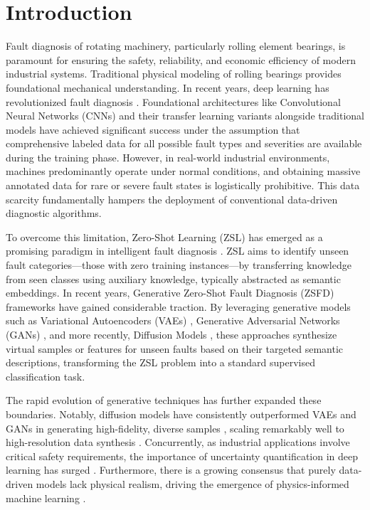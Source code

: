 \section{Introduction}
\label{sec:intro}

Fault diagnosis of rotating machinery, particularly rolling element bearings, is paramount for ensuring the safety, reliability, and economic efficiency of modern industrial systems. Traditional physical modeling of rolling bearings \cite{harris2001rolling,mcfadden1984model} provides foundational mechanical understanding. In recent years, deep learning has revolutionized fault diagnosis \cite{liu2018artificial}. Foundational architectures like Convolutional Neural Networks (CNNs) \cite{jia2016deep,wen2018new,zhang2018deep} and their transfer learning variants \cite{li2020deep} alongside traditional models \cite{zhao2019deep,lei2020applications} have achieved significant success under the assumption that comprehensive labeled data for all possible fault types and severities are available during the training phase. However, in real-world industrial environments, machines predominantly operate under normal conditions, and obtaining massive annotated data for rare or severe fault states is logistically prohibitive. This data scarcity fundamentally hampers the deployment of conventional data-driven diagnostic algorithms. 

To overcome this limitation, Zero-Shot Learning (ZSL) has emerged as a promising paradigm in intelligent fault diagnosis \cite{xian2018zero,pan2009survey}. ZSL aims to identify unseen fault categories—those with zero training instances—by transferring knowledge from seen classes using auxiliary knowledge, typically abstracted as semantic embeddings. In recent years, Generative Zero-Shot Fault Diagnosis (ZSFD) frameworks have gained considerable traction. By leveraging generative models such as Variational Autoencoders (VAEs) \cite{kingma2013auto}, Generative Adversarial Networks (GANs) \cite{goodfellow2014generative}, and more recently, Diffusion Models \cite{ho2020denoising}, these approaches synthesize virtual samples or features for unseen faults based on their targeted semantic descriptions, transforming the ZSL problem into a standard supervised classification task.

The rapid evolution of generative techniques has further expanded these boundaries. Notably, diffusion models have consistently outperformed VAEs and GANs in generating high-fidelity, diverse samples \cite{dhariwal2021diffusion,nichol2021improved}, scaling remarkably well to high-resolution data synthesis \cite{rombach2022high}. Concurrently, as industrial applications involve critical safety requirements, the importance of uncertainty quantification in deep learning has surged \cite{kendall2017uncertainties,abdar2021review}. Furthermore, there is a growing consensus that purely data-driven models lack physical realism, driving the emergence of physics-informed machine learning \cite{karniadakis2021physics}. 

